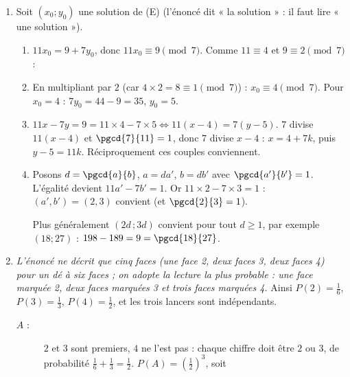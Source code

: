 \begin{enumerate}
	\item Soit $(x_0 ; y_0)$ une solution de (E) (l'énoncé dit « la solution » : il faut lire « une solution »).
	\begin{enumerate}
		\item {}
			$11x_0 = 9 + 7y_0$, donc $11x_0 \equiv 9 \pmod 7$. Comme $11 \equiv 4$ et $9 \equiv 2 \pmod 7$ :
			\par\noindent{}
		\item {}
			En multipliant par $2$ (car $4 \times 2 = 8 \equiv 1 \pmod 7$) : $x_0 \equiv 4 \pmod 7$.
			Pour $x_0 = 4$ : $7y_0 = 44 - 9 = 35$, $y_0 = 5$.
			\par\noindent{}
		\item {}
			$11x - 7y = 9 = 11 \times 4 - 7 \times 5 \iff 11(x - 4) = 7(y - 5)$.
			$7$ divise $11(x-4)$ et $\pgcd{7}{11} = 1$, donc $7$ divise $x - 4$ : $x = 4 + 7k$, puis $y - 5 = 11k$. Réciproquement ces couples conviennent.
			\par\noindent{}
		\item {}
			Posons $d = \pgcd{a}{b}$, $a = da'$, $b = db'$ avec $\pgcd{a'}{b'} = 1$. L'égalité devient $11a' - 7b' = 1$.
			Or $11 \times 2 - 7 \times 3 = 1$ : $(a',b') = (2,3)$ convient (et $\pgcd{2}{3} = 1$).
			\par\noindent{}
			Plus généralement $(2d \, ; 3d)$ convient pour tout $d \geq 1$, par exemple $(18 ; 27)$ : $198 - 189 = 9 = \pgcd{18}{27}$.
	\end{enumerate}
	\item \textit{L'énoncé ne décrit que cinq faces (une face 2, deux faces 3, deux faces 4) pour un dé à six faces ; on adopte la lecture la plus probable :
		une face marquée 2, deux faces marquées 3 et trois faces marquées 4.}
		Ainsi $P(2) = \frac{1}{6}$, $P(3) = \frac{1}{3}$, $P(4) = \frac{1}{2}$, et les trois lancers sont indépendants.
	\begin{description}
		\item[$A$ :] 
			$2$ et $3$ sont premiers, $4$ ne l'est pas : chaque chiffre doit être $2$ ou $3$, de probabilité $\frac{1}{6} + \frac{1}{3} = \frac{1}{2}$.
			$P(A) = \left(\frac{1}{2}\right)^3$, soit \par\noindent{}

\end{description}
\end{enumerate}
